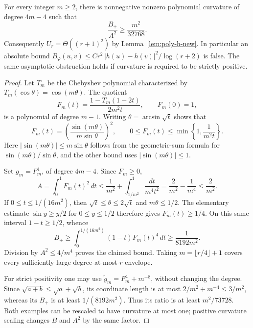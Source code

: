 \begin{proposition}
For every integer $m\geq2$, there is nonnegative nonzero polynomial
curvature of degree $4m-4$ such that
\[
 \frac{B_+}{A^2}\geq\frac{m^2}{32768}.
\]
Consequently $U_r=\Theta((r+1)^2)$ by Lemma~\ref{lem:poly-h-new}. In particular an absolute bound
$B_\varphi(u,v)\leq C r^2\,|h(u)-h(v)|^2/\log(r+2)$ is false.
The same asymptotic obstruction holds if curvature is required to be
strictly positive.
\end{proposition}
\begin{proof}
Let $T_m$ be the Chebyshev polynomial characterized by
$T_m(\cos\theta)=\cos(m\theta)$. The quotient
\[
 F_m(t)=\frac{1-T_m(1-2t)}{2m^2t},\qquad F_m(0)=1,
\]
is a polynomial of degree $m-1$. Writing $\theta=\arcsin\sqrt t$
shows that
\[
 F_m(t)=\left(\frac{\sin(m\theta)}{m\sin\theta}\right)^2,
 \qquad 0\leq F_m(t)\leq
     \min\left\{1,\frac1{m^2t}\right\}.
\]
Here $|\sin(m\theta)|\leq m\sin\theta$ follows from the geometric-sum
formula for $\sin(m\theta)/\sin\theta$, and the other bound uses
$|\sin(m\theta)|\leq1$.

Set $g_m=F_m^4$, of degree $4m-4$. Since $F_m\geq0$,
\[
 A=\int_0^1F_m(t)^2\,dt
 \leq\frac1{m^2}+\int_{1/m^2}^1\frac{dt}{m^4t^2}
 =\frac2{m^2}-\frac1{m^4}\leq\frac2{m^2}.
\]
If $0\leq t\leq1/(16m^2)$, then
$\sqrt t\leq\theta\leq2\sqrt t$ and $m\theta\leq1/2$.
The elementary estimate $\sin y\geq y/2$ for $0\leq y\leq1/2$
therefore gives $F_m(t)\geq1/4$. On this same interval $1-t\geq1/2$,
whence
\[
 B_+\geq\int_0^{1/(16m^2)}(1-t)F_m(t)^4\,dt
 \geq\frac1{8192m^2}.
\]
Division by $A^2\leq4/m^4$ proves the claimed bound. Taking
$m=\lfloor r/4\rfloor+1$ covers every sufficiently large
degree-at-most-$r$ envelope.

For strict positivity one may use $\widetilde g_m=F_m^4+m^{-8}$,
without changing the degree. Since $\sqrt{a+b}\leq\sqrt a+\sqrt b$,
its coordinate length is at most $2/m^2+m^{-4}\leq3/m^2$, whereas its
$B_+$ is at least $1/(8192m^2)$. Thus its ratio is at least
$m^2/73728$. Both examples can be rescaled to have curvature at most one;
positive curvature scaling changes $B$ and $A^2$ by the same factor.
\end{proof}

